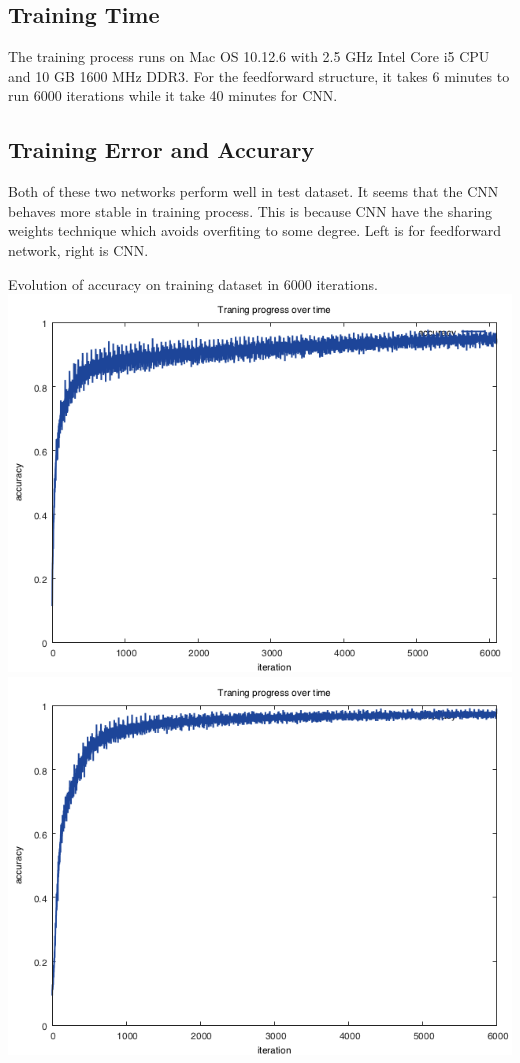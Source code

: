 \documentclass[12pt]{article}
\begin{document}
\subsection{Training Time}
The training process runs on Mac OS 10.12.6 with 2.5 GHz Intel Core i5 CPU and 10 GB 1600 MHz DDR3. For the feedforward structure, it takes 6 minutes to run 6000 iterations while it take 40 minutes for CNN.

\subsection{Training Error and Accurary}
Both of these two networks perform well in test dataset. It seems that the CNN behaves more stable in training process. This is because CNN have the sharing weights technique which avoids overfiting to some degree. Left is for feedforward network, right is CNN. 
\begin{center}
  Evolution of accuracy on training dataset in 6000 iterations.\\
  \includegraphics[angle = 0, width = .48\textwidth]{./train_images/mlpnet_Mnist_accuracy.png}
  \includegraphics[angle = 0, width = .48\textwidth]{./train_images/lenet_Mnist_accuracy.png}
\end{center}
\end{document}
